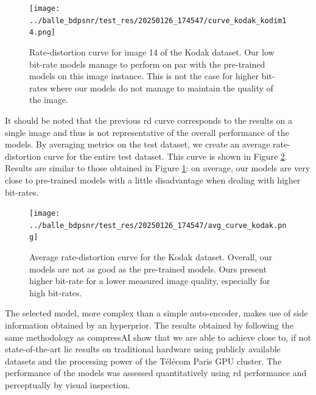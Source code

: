 \begin{figure}
    \centering
    \texttt{[image: ../balle\_bdpsnr/test\_res/20250126\_174547/curve\_kodak\_kodim14.png]}
    \caption[Rate-distortion curve for image 14 of the Kodak dataset.]{Rate-distortion curve for image 14 of the Kodak dataset. Our low bit-rate models manage to perform on par with the pre-trained models on this image instance. This is not the case for higher bit-rates where our models do not manage to maintain the quality of the image.}
    \label{bdpsnr_2}
\end{figure}

It should be noted that the previous \acrshort{rd} curve corresponds to the results on a single image and thus is not representative of the overall performance of the models. By averaging metrics on the test dataset, we create an average rate-distortion curve for the entire test dataset. This curve is shown in Figure \ref{bdpsnr_3}. Results are similar to those obtained in Figure \ref{bdpsnr_2}: on average, our models are very close to pre-trained models with a little disadvantage when dealing with higher bit-rates.

\begin{figure}
    \centering
    \texttt{[image: ../balle\_bdpsnr/test\_res/20250126\_174547/avg\_curve\_kodak.png]}
    \caption[Average rate-distortion curve for the Kodak dataset.]{Average rate-distortion curve for the Kodak dataset. Overall, our models are not as good as the pre-trained models. Ours present higher bit-rate for a lower measured image quality, especially for high bit-rates.}
    \label{bdpsnr_3}
\end{figure}

The selected model, more complex than a simple auto-encoder, makes use of side information obtained by an hyperprior. The results obtained by following the same methodology as compressAI show that we are able to achieve close to, if not state-of-the-art \acrshort{lic} results on traditional hardware using publicly available datasets and the processing power of the Télécom Paris GPU cluster. The performance of the models was assessed quantitatively using \acrshort{rd} performance and perceptually by visual inspection.